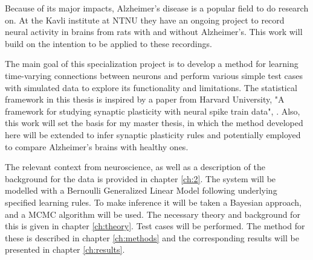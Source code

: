 Because of its major impacts, Alzheimer's disease is a popular field to do research on. At the Kavli institute at NTNU they have an ongoing project to record neural activity in brains from rats with and without Alzheimer’s. This work will build on the intention to be applied to these recordings.


The main goal of this specialization project is to develop a method for learning time-varying connections between neurons and perform various simple test cases with simulated data to explore its functionality and limitations. The statistical framework in this thesis is inspired by a paper from Harvard University, "A framework for studying synaptic plasticity with neural spike train data", \cite{Linderman}. Also, this work will set the basis for my master thesis, in which the method developed here will be extended to infer synaptic plasticity rules and potentially employed to compare Alzheimer's brains with healthy ones.

The relevant context from neuroscience, as well as a description of the background for the data is provided in chapter \ref{ch:2}. The system will be modelled with a Bernoulli Generalized Linear Model following underlying specified learning rules. To make inference it will be taken a Bayesian approach, and a MCMC algorithm will be used. The necessary theory and background for this is given in chapter \ref{ch:theory}. Test cases will be performed. The method for these is described in chapter \ref{ch:methods} and the corresponding results will be presented in chapter \ref{ch:results}.


